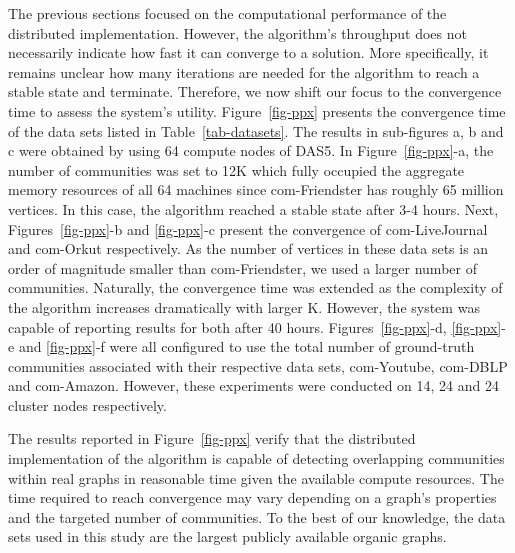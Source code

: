 The previous sections focused on the computational performance of the
distributed implementation. However, the algorithm's throughput does not
necessarily indicate how fast it can converge to a solution. More specifically, it
remains unclear how many iterations are needed for the algorithm to reach a
stable state and terminate. Therefore, we now shift our focus to the
convergence time to assess the system's utility. Figure~\ref{fig-ppx} presents
the convergence time of the data sets listed in Table~\ref{tab-datasets}.
%
The results in sub-figures a, b and c were obtained by using 64 compute nodes
of DAS5. In Figure~\ref{fig-ppx}-a, the number of communities was set to 12K
which fully occupied the aggregate memory resources of all 64 machines since
com-Friendster has roughly 65 million vertices. In this case, the algorithm
reached a stable state after 3-4 hours. Next, Figures~\ref{fig-ppx}-b and
\ref{fig-ppx}-c present the convergence of com-LiveJournal and com-Orkut
respectively. As the number of vertices in these data sets is an order of
magnitude smaller than com-Friendster, we used a larger number of
communities. Naturally, the convergence time was extended as the complexity of
the algorithm increases dramatically with larger K. However, the system was
capable of reporting results for both after 40 hours.
%
Figures~\ref{fig-ppx}-d, \ref{fig-ppx}-e and \ref{fig-ppx}-f were all
configured to use the total number of ground-truth communities associated with
their respective data sets, com-Youtube, com-DBLP and com-Amazon. However,
these experiments were conducted on 14, 24 and 24 cluster nodes respectively.

The results reported in Figure~\ref{fig-ppx} verify that the distributed
implementation of the algorithm is capable of detecting overlapping communities
within real graphs in reasonable time given the available compute resources.
The time required to reach convergence may vary depending on a graph's properties and
the targeted number of communities. To the best of our knowledge, the data sets
used in this study are the largest publicly available organic graphs.

